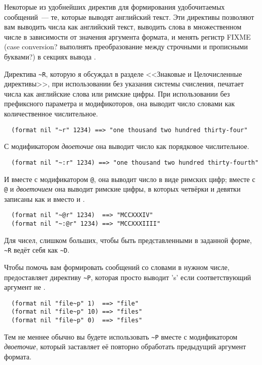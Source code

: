 Некоторые из удобнейших директив  для формирования удобочитаемых
сообщений~--- те, которые выводят английский текст. Эти директивы позволяют вам выводить
числа как английский текст, выводить слова в множественном числе в зависимости от значения
аргумента формата, и менять регистр FIXME (case conversion?  выполнять преобразование
между строчными и прописными буквами?) в секциях вывода .

Директива \lstinline!~R!, которую я обсуждал в разделе <<Знаковые и Целочисленные
директивы>>, при использовании без указания системы счисления, печатает числа как
английские слова или римские цифры. При использовании без префиксного параметра и
модификоторов, она выводит число словами как количественное числительное.

\begin{verbatim}
  (format nil "~r" 1234) ==> "one thousand two hundred thirty-four"
\end{verbatim}

С модификатором \textit{двоеточие} она выводит число как порядковое числительное.

\begin{verbatim}
  (format nil "~:r" 1234) ==> "one thousand two hundred thirty-fourth"
\end{verbatim}

И вместе с модификатором \lstinline!@!, она выводит число в виде римских цифр; вместе с
\lstinline!@! и \textit{двоеточием} она выводит римские цифры, в которых четвёрки и
девятки записаны как  и  вместо  и .

\begin{verbatim}
  (format nil "~@r" 1234)  ==> "MCCXXXIV"
  (format nil "~:@r" 1234) ==> "MCCXXXIIII"
\end{verbatim}

Для чисел, слишком больших, чтобы быть представленными в заданной форме, \lstinline!~R!
ведёт себя как \lstinline!~D!.

Чтобы помочь вам формировать сообщений со словами в нужном числе, 
предоставляет директиву \lstinline!~P!, которая просто выводит 's' если соответствующий
аргумент не .

\begin{verbatim}
  (format nil "file~p" 1)  ==> "file"
  (format nil "file~p" 10) ==> "files"
  (format nil "file~p" 0)  ==> "files"
\end{verbatim}

Тем не меннее обычно вы будете использовать \lstinline!~P! вместе с модификатором
\textit{двоеточие}, который заставляет её повторно обработать предыдущий аргумент формата.

